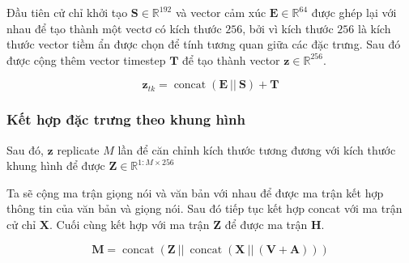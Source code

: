 


Đầu tiên cử chỉ khởi tạo $\mathbf{S} \in \mathbb{R}^{192}$ và vector cảm xúc $\mathbf{E} \in \mathbb{R}^{64}$ được ghép lại với nhau để tạo thành một vectơ có kích thước $256$, bởi vì kích thước $256$ là kích thước vector tiềm ẩn được chọn để tính tương quan giữa các đặc trưng. Sau đó được cộng thêm vector timestep $\mathbf{T}$ để tạo thành vector $\mathbf{z} \in \mathbb{R}^{256}$.

\begin{equation}
	\label{eq:ConditionConcat}
	\mathbf{z}_{tk} = \operatorname{concat }(\mathbf{E}\ || \  \mathbf{S}) + \mathbf{T}
\end{equation}



\subsubsection{Kết hợp đặc trưng theo khung hình}

Sau đó, $\mathbf{z}$  replicate $M$ lần để căn chỉnh kích thước tương đương với kích thước khung hình để được $\mathbf{Z} \in \mathbb{R}^{1:M \times 256}$


Ta sẽ cộng ma trận giọng nói và văn bản với nhau để được ma trận kết hợp thông tin của văn bản và giọng nói. Sau đó tiếp tục kết hợp concat với ma trận cử chỉ $\mathbf{X}$. Cuối cùng kết hợp với ma trận $\mathbf{Z}$ để được ma trận $\mathbf{H}$.

\begin{equation}
	\label{eq:FrameConcat}
	\mathbf{M} = \operatorname{concat}( \mathbf{Z}\  || \   \operatorname{concat}(\mathbf{X}\ || \  (\mathbf{V} + \mathbf{A}) ) )
\end{equation}

